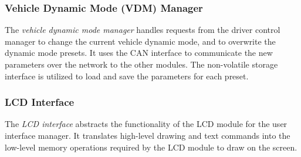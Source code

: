 \subsubsection{Vehicle Dynamic Mode (VDM) Manager}

The \emph{vehicle dynamic mode manager} handles requests from the driver control manager to change the current vehicle dynamic mode, and to overwrite the dynamic mode presets. It uses the CAN interface to communicate the new parameters over the network to the other modules. The non-volatile storage interface is utilized to load and save the parameters for each preset.

\subsubsection{LCD Interface}

The \emph{LCD interface} abstracts the functionality of the LCD module for the user interface manager. It translates high-level drawing and text commands into the low-level memory operations required by the LCD module to draw on the screen.

